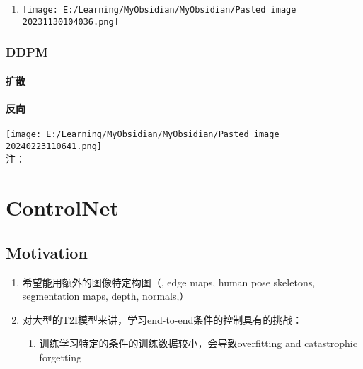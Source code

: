 \documentclass[
]{article}
\providecommand{\tightlist}{%
  \setlength{\itemsep}{0pt}\setlength{\parskip}{0pt}}
\begin{document}
\begin{enumerate}
\begin{enumerate}
    \begin{enumerate}
    \tightlist
    \item
      \texttt{[image: E:/Learning/MyObsidian/MyObsidian/Pasted image 20231130104036.png]}
    \end{enumerate}
  \end{enumerate}
\end{enumerate}

\subsubsection{DDPM}\label{ddpm}

\paragraph{扩散}\label{ux6269ux6563}

{}{}{}

\paragraph{反向}\label{ux53cdux5411}

{} {}{}

\texttt{[image: E:/Learning/MyObsidian/MyObsidian/Pasted image 20240223110641.png]}\\
注：

\section{ControlNet}\label{controlnet}

\subsection{Motivation}\label{motivation}

\begin{enumerate}
\tightlist
\item
  希望能用额外的图像特定构图（, edge maps, human pose skeletons,
  segmentation maps, depth, normals,）
\item
  对大型的T2I模型来讲，学习end-to-end条件的控制具有的挑战：

  \begin{enumerate}
  \tightlist
  \item
    训练学习特定的条件的训练数据较小，会导致overfitting and catastrophic
    forgetting
  \end{enumerate}
\end{enumerate}
\end{document}
